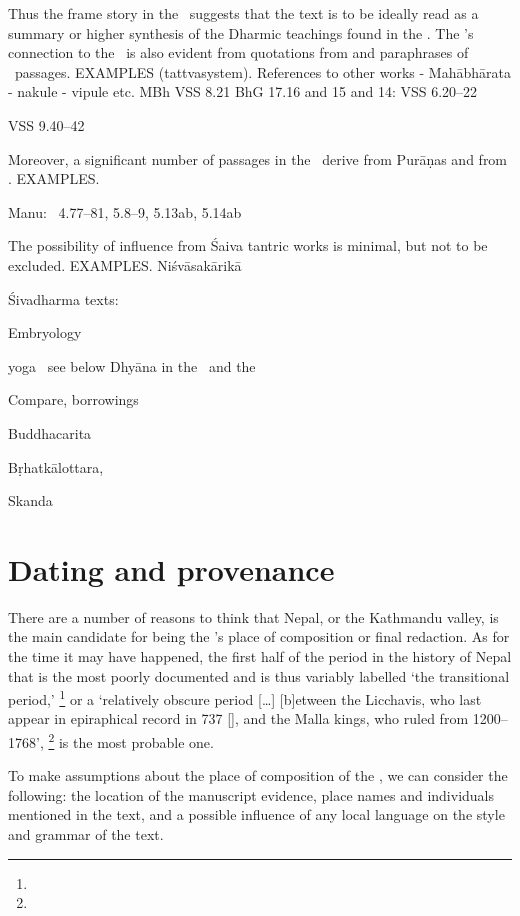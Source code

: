 \noindent
Thus the frame story in the \VSS\ suggests
that the text is to be ideally read as a summary 
or higher synthesis of the Dharmic teachings found
in the \MBH. The \VSS's connection to the \MBH\
is also evident from quotations from and paraphrases
of \MBH\ passages. EXAMPLES (tattvasystem).
  References to other works - Mahābhārata - nakule - vipule etc.
MBh VSS 8.21
BhG 17.16 and 15 and 14: VSS 6.20--22

VSS 9.40--42
	
Moreover, a significant number of passages in 
the \VSS\ derive from Purāṇas and from \Manu. EXAMPLES.

Manu: \VSS\ 4.77--81, 5.8--9, 5.13ab, 5.14ab

The possibility of influence from Śaiva tantric works is
minimal, but not to be excluded. EXAMPLES.
Niśvāsakārikā



Śivadharma texts:
\label{vss_connection_other_sd_texts}


Embryology

yoga \DharmP\ see below
Dhyāna in the \VSS\ and the \DHARMP
\label{dharmaputrika}

Compare, borrowings

Buddhacarita 

Bṛhatkālottara,

Skanda







\section{Dating and provenance}
\label{provenance}
There are a number of reasons to think that
Nepal, or the Kathmandu valley, is the main
candidate for being the \VSS's place of composition
or final redaction. As for the time it may have 
happened, the first half of the period in the history of Nepal 
that is the most poorly documented and is thus 
variably labelled `the transitional period,'%
	\footnote{}
or a `relatively obscure period [\dots]
[b]etween the Licchavis, who last appear 
in epiraphical record in 737 [\CE], 
and the Malla kings, who ruled from 1200--1768',%
	\footnote{}
is the most probable one.

To make assumptions about the place of 
composition of the \VSS, we can consider 
the following: the location of the manuscript 
evidence, place names and individuals  
mentioned in the text, and a possible influence
of any local language on the style and grammar
of the text.

